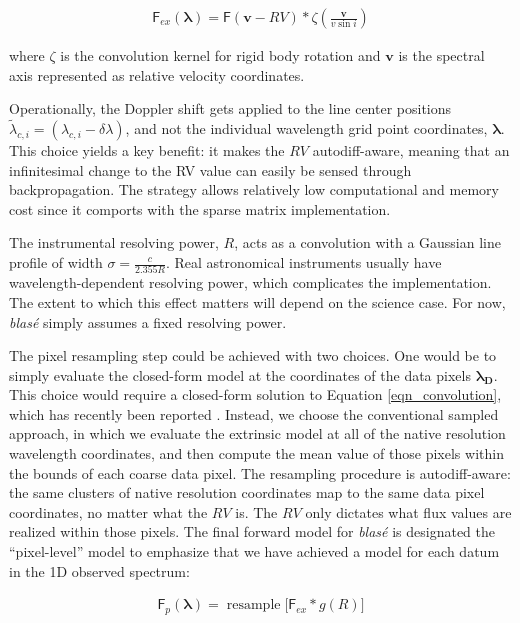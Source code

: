 \documentclass[modern]{aastex631}
\DeclareMathOperator{\resample}{resample}
\begin{document}
\begin{eqnarray}
    \mathsf{F}_{ex}(\bm{\lambda}) = \mathsf{F}(\bm{v}-RV) * \zeta \left(\frac{\bm{v}}{v\sin{i}}\right) \label{eqn_convolution}
\end{eqnarray}

where $\zeta$ is the convolution kernel for rigid body rotation \citep{2022ApJS..258...31K} and $\bm{v}$ is the spectral axis represented as relative velocity coordinates.

Operationally, the Doppler shift gets applied to the line center positions $\tilde \lambda_{c,i} = (\lambda_{c,i}-\delta \lambda)$, and not the individual wavelength grid point coordinates, $\bm{\lambda}$. This choice yields a key benefit: it makes the $RV$ autodiff-aware, meaning that an infinitesimal change to the RV value can easily be sensed through backpropagation.  The strategy allows relatively low computational and memory cost since it comports with the sparse matrix implementation.

The instrumental resolving power, $R$, acts as a convolution with a Gaussian line profile of width $\sigma=\frac{c}{2.355 R}$.  Real astronomical instruments usually have wavelength-dependent resolving power, which complicates the implementation.  The extent to which this effect matters will depend on the science case.  For now, \emph{blas\'e} simply assumes a fixed resolving power.

The pixel resampling step could be achieved with two choices.  One would be to simply evaluate the closed-form model at the coordinates of the data pixels $\bm{\lambda_D}$.  This choice would require a closed-form solution to Equation \ref{eqn_convolution}, which has recently been reported \citep{2021arXiv211006271L}.  Instead, we choose the conventional sampled approach, in which we evaluate the extrinsic model at all of the native resolution wavelength coordinates, and then compute the mean value of those pixels within the bounds of each coarse data pixel.  The resampling procedure is autodiff-aware: the same clusters of native resolution coordinates map to the same data pixel coordinates, no matter what the $RV$ is.  The $RV$ only dictates what flux values are realized within those pixels.  The final forward model for \emph{blas\'e} is designated the ``pixel-level'' model to emphasize that we have achieved a model for each datum in the 1D observed spectrum:

\begin{eqnarray}
    \mathsf{F}_{p}(\bm{\lambda}) = \resample{\Big[\mathsf{F}_{ex} * g(R) \Big]} \label{eqn_final_model}
\end{eqnarray}
\end{document}
